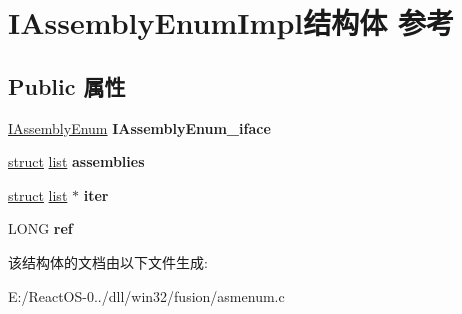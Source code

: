 \hypertarget{struct_i_assembly_enum_impl}{}\section{I\+Assembly\+Enum\+Impl结构体 参考}
\label{struct_i_assembly_enum_impl}
\subsection*{Public 属性}
\begin{DoxyCompactItemize}
\item 
\mbox{\label{struct_i_assembly_enum_impl_a6dce75b65273f5235d77164e7f8f02d2}} 
\hyperlink{interface_i_assembly_enum}{I\+Assembly\+Enum} {\bfseries I\+Assembly\+Enum\+\_\+iface}
\item 
\mbox{\label{struct_i_assembly_enum_impl_a8b9a32d6c365cad2fb8eee216ffdb3c3}} 
\hyperlink{interfacestruct}{struct} \hyperlink{classlist}{list} {\bfseries assemblies}
\item 
\mbox{\label{struct_i_assembly_enum_impl_a9416753a0deae56f37d2fdfe9780e6d3}} 
\hyperlink{interfacestruct}{struct} \hyperlink{classlist}{list} $\ast$ {\bfseries iter}
\item 
\mbox{\label{struct_i_assembly_enum_impl_a4d0e2cba67cd0ef8077e6adf9f4fd964}} 
L\+O\+NG {\bfseries ref}
\end{DoxyCompactItemize}


该结构体的文档由以下文件生成\+:\begin{DoxyCompactItemize}
\item 
E\+:/\+React\+O\+S-\/0../dll/win32/fusion/asmenum.\+c\end{DoxyCompactItemize}
